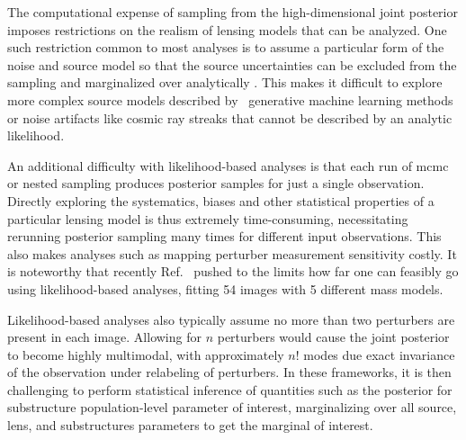 The computational expense of sampling from the high-dimensional joint posterior imposes restrictions on the realism of lensing models that can be analyzed. One such restriction common to most analyses is to  assume a particular form of the noise and source model so that the source uncertainties can be excluded from the sampling and marginalized over analytically \cite{Hezaveh:2016ltk,Vegetti:2008eg,Vegetti:2009cz,Vegetti:2010wa,Vegetti:2012mc}. This makes it difficult to explore more complex source models described by \eg~generative machine learning methods or noise artifacts like cosmic ray streaks that cannot be described by an analytic likelihood.

An additional difficulty with likelihood-based analyses is that each run of \gls*{mcmc} or nested sampling produces posterior samples for just a single observation. Directly exploring the systematics, biases and other statistical properties of a particular lensing model is thus extremely time-consuming, necessitating rerunning posterior sampling many times for different input observations. This also makes analyses such as mapping perturber measurement sensitivity costly. It is noteworthy that recently Ref.~\cite{Nightingale:2022bhh} pushed to the limits how far one can feasibly go using likelihood-based analyses, fitting 54 images with 5 different mass models.

Likelihood-based analyses also typically assume no more than two perturbers are present in each image. Allowing for $n$ perturbers would cause the joint posterior to become highly multimodal, with approximately $n!$ modes due exact invariance of the observation under relabeling of perturbers. In these frameworks, it is then challenging to perform statistical inference of quantities such as the posterior for substructure population-level parameter of interest, marginalizing over all source, lens, and substructures parameters to get the marginal of interest.



